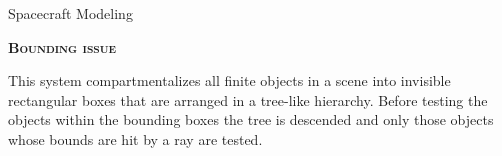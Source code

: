 \documentclass[10pt]{beamer}
\begin{document}
\begin{frame}{Spacecraft Modeling}

  \bigskip

  \textsc{\textbf{\large Bounding issue}}

  \bigskip

  This system compartmentalizes all finite objects in a scene into invisible rectangular boxes that are arranged in a tree-like hierarchy. Before testing the objects within the bounding boxes the tree is descended and only those objects whose bounds are hit by a ray are tested.

  \smallskip

  \begin{figure}
    \captionsetup[subfigure]{labelformat=empty}
    \centering
    \qquad
    \qquad
  \end{figure}

  \bigskip
\end{frame}
\end{document}
